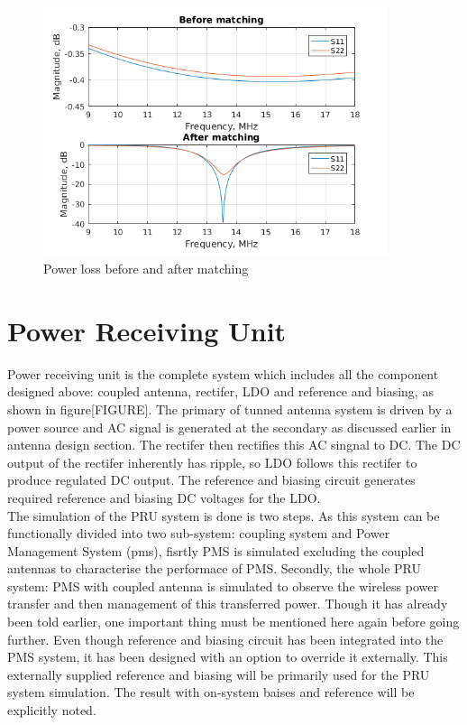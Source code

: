 \documentclass[12pt,a4paper,UKenglish]{article}
\begin{document}
\begin{figure} [!htbp]
  \centering
  \includegraphics[width=0.9\textwidth]{img/ant_S_loss.png} 
 \caption{Power loss before and after matching} 
\label{fig:ant_S_loss} 
\end{figure}

\clearpage
\newpage


\section{Power Receiving Unit}
Power receiving unit is the complete system which includes all the component designed above: coupled antenna, 
rectifer, LDO and reference and biasing, as shown in figure[FIGURE]. The primary of tunned antenna system is 
driven by a power source and AC signal is generated at the secondary as discussed earlier in antenna design 
section. The rectifer then rectifies this AC singnal to DC. The DC output of the rectifer inherently has ripple, 
so LDO follows this rectifer to produce regulated DC output. The reference and biasing circuit generates required 
reference and biasing DC voltages for the LDO. \\

The simulation of the PRU system is done is two steps. As this system can be functionally divided into two sub-system: 
coupling system and Power Management System (\acrshort{pms}), fisrtly PMS is simulated excluding the coupled antennas 
to characterise the performace of PMS. Secondly, the whole PRU system: PMS with coupled antenna is simulated to observe 
the wireless power transfer and then management of this transferred power. Though it has already been told earlier, 
one important thing must be mentioned here again before going further. Even though reference and biasing circuit has 
been integrated into the PMS system, it has been designed with an option to override it externally. This externally 
supplied reference and biasing will be primarily used for the PRU system simulation. The result with on-system baises 
and reference will be explicitly noted. \\
\end{document}
